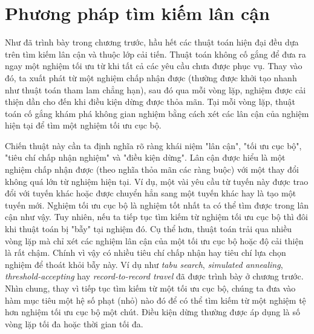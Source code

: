 \chapter{Phương pháp tìm kiếm lân cận}

Như đã trình bày trong chương trước, hầu hết các thuật toán hiện đại đều dựa trên tìm kiếm lân cận và thuộc lớp cải tiến. Thuật toán không cố gắng để đưa ra ngay một nghiệm tối ưu từ khi tất cả các yêu cầu chưa được phục vụ. Thay vào đó, ta xuất phát từ một nghiệm chấp nhận được (thường được khởi tạo nhanh như thuật toán tham lam chẳng hạn), sau đó qua mỗi vòng lặp, nghiệm được cải thiện dần cho đến khi điều kiện dừng được thỏa mãn. Tại mỗi vòng lặp, thuật toán cố gắng khám phá không gian nghiệm bằng cách xét các lân cận của nghiệm hiện tại để tìm một nghiệm tối ưu cục bộ. 

Chiến thuật này cần ta định nghĩa rõ ràng khái niệm "lân cận", "tối ưu cục bộ", "tiêu chí chấp nhận nghiệm" và "điều kiện dừng". Lân cận được hiểu là một nghiệm chấp nhận được (theo nghĩa thỏa mãn các ràng buộc) với một thay đổi không quá lớn từ nghiệm hiện tại. Ví dụ, một vài yêu cầu từ tuyến này được trao đổi với tuyến khác hoặc được chuyển hẳn sang một tuyến khác hay là tạo một tuyến mới. Nghiệm tối ưu cục bộ là nghiệm tốt nhất ta có thể tìm được trong lân cận như vậy. Tuy nhiên, nếu ta tiếp tục tìm kiếm từ nghiệm tối ưu cục bộ thì đôi khi thuật toán bị "bẫy" tại nghiệm đó. Cụ thể hơn, thuật toán trải qua nhiều vòng lặp mà chỉ xét các nghiệm lân cận của một tối ưu cục bộ hoặc độ cải thiện là rất chậm. Chính vì vậy có nhiều tiêu chí chấp nhận hay tiêu chí lựa chọn nghiệm để thoát khỏi bẫy này. Ví dụ như \textit{tabu search}, \textit{simulated annealing}, \textit{threshold-accepting} hay \textit{record-to-record travel} đã được trình bày ở chương trước. Nhìn chung, thay vì tiếp tục tìm kiếm từ một tối ưu cục bộ, chúng ta đưa vào hàm mục tiêu một hệ số phạt (nhỏ) nào đó để có thể tìm kiếm từ một nghiệm tệ hơn nghiệm tối ưu cục bộ một chút. Điều kiện dừng thường được áp dụng là số vòng lặp tối đa hoặc thời gian tối đa.


